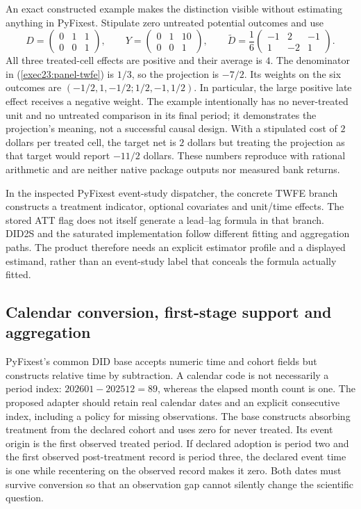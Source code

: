 An exact constructed example makes the distinction visible without estimating
anything in PyFixest. Stipulate zero untreated potential outcomes and use
\begin{equation}
 D=\begin{pmatrix}0&1&1\\0&0&1\end{pmatrix},
 \qquad
 Y=\begin{pmatrix}0&1&10\\0&0&1\end{pmatrix},
 \qquad
 \widetilde D=\frac16
 \begin{pmatrix}-1&2&-1\\1&-2&1\end{pmatrix}.
 \label{exec23:panel-witness}
\end{equation}
All three treated-cell effects are positive and their average is $4$. The
denominator in (\ref{exec23:panel-twfe}) is $1/3$, so the projection is $-7/2$.
Its weights on the six outcomes are
$(-1/2,1,-1/2;1/2,-1,1/2)$. In particular, the large positive late effect
receives a negative weight. The example intentionally has no never-treated
unit and no untreated comparison in its final period; it demonstrates the
projection's meaning, not a successful causal design. With a stipulated cost
of $2$ dollars per treated cell, the target net is $2$ dollars but treating the
projection as that target would report $-11/2$ dollars. These numbers reproduce
with rational arithmetic and are neither native package outputs nor measured
bank returns. \citep{exec23_pyfixest_reference}

In the inspected PyFixest event-study dispatcher, the concrete TWFE branch
constructs a treatment indicator, optional covariates and unit/time effects.
The stored ATT flag does not itself generate a lead--lag formula in that
branch. DID2S and the saturated implementation follow different fitting and
aggregation paths. The product therefore needs an explicit estimator profile
and a displayed estimand, rather than an event-study label that conceals the
formula actually fitted. \citep{exec23_pyfixest_reuse_source}

\subsection{Calendar conversion, first-stage support and aggregation}
\label{exec23:panel-clock}
PyFixest's common DID base accepts numeric time and cohort fields but constructs
relative time by subtraction. A calendar code is not necessarily a period
index: $202601-202512=89$, whereas the elapsed month count is one. The proposed
adapter should retain real calendar dates and an explicit consecutive index,
including a policy for missing observations. The base constructs absorbing
treatment from the declared cohort and uses zero for never treated. Its event
origin is the first observed treated period. If declared adoption is period
two and the first observed post-treatment record is period three, the declared
event time is one while recentering on the observed record makes it zero. Both
dates must survive conversion so that an observation gap cannot silently
change the scientific question.
\citep{exec23_pyfixest_reuse_source,exec23_pyfixest_reference}

